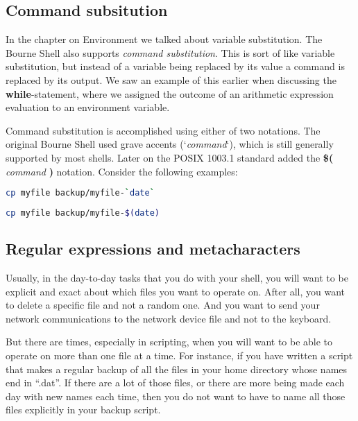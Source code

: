 \subsection{Command subsitution}
In the chapter on Environment we talked about variable substitution. The Bourne
Shell also supports \emph{command substitution}. This is sort of like variable
substitution, but instead of a variable being replaced by its value a command
is replaced by its output. We saw an example of this earlier when discussing
the \textbf{while}-statement, where we assigned the outcome of an arithmetic
expression evaluation to an environment variable.

Command substitution is accomplished using either of two notations. The
original Bourne Shell used grave accents (`\emph{command}`), which is still
generally supported by most shells. Later on the POSIX 1003.1 standard added
the \textbf{\$(} \emph{command} \textbf{)} notation. Consider the following
examples:

\lstset{basicstyle=\scriptsize, numbers=left, captionpos=b, tabsize=4}
\begin{lstlisting}[caption=Making a daily backup (old-skool),language={bash},
breaklines=true,xleftmargin=15pt,label=lst:Making a daily backup (old-skool)]
cp myfile backup/myfile-`date`
\end{lstlisting}

\lstset{basicstyle=\scriptsize, numbers=left, captionpos=b, tabsize=4}
\begin{lstlisting}[caption=Making a daily backup (POSIX 1003.1),language={bash},
breaklines=true,xleftmargin=15pt,label=lst:Making a daily backup (POSIX 1003.1)]
cp myfile backup/myfile-$(date)
\end{lstlisting}

\subsection{Regular expressions and metacharacters}
Usually, in the day-to-day tasks that you do with your shell, you will want to
be explicit and exact about which files you want to operate on. After all, you
want to delete a specific file and not a random one. And you want to send your
network communications to the network device file and not to the keyboard.

But there are times, especially in scripting, when you will want to be able to
operate on more than one file at a time. For instance, if you have written a
script that makes a regular backup of all the files in your home directory
whose names end in ``.dat''. If there are a lot of those files, or there are
more being made each day with new names each time, then you do not want to have
to name all those files explicitly in your backup script.

